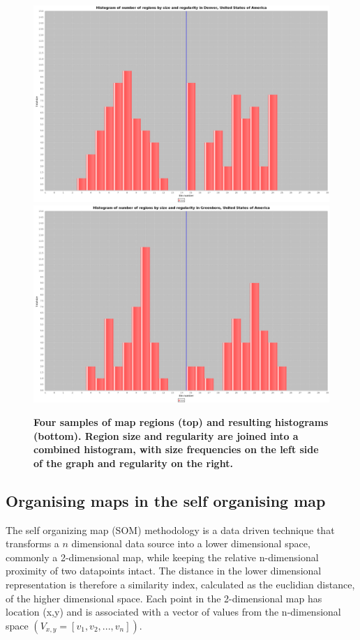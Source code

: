 \documentclass{nature}
\begin{document}
\begin{figure}
\includegraphics[scale=0.06]{Images/Combinedcity169-59949.png}
\includegraphics[scale=0.06]{Images/Combinedcity1521-754459.png}
\caption{\bf Four samples of map regions (top) and resulting histograms (bottom). Region size and regularity are joined into a combined histogram, with size frequencies on the left side of the graph and regularity on the right.}    
 \label{fig:mapsandHist}  
\end{figure} 


\subsection{Organising maps in the self organising map}\label{methodscluster}
The self organizing map (SOM) methodology \cite{Kohonen1982} is a data driven technique that transforms a $n$ dimensional data source into a lower dimensional space, commonly a 2-dimensional map, while keeping the relative n-dimensional proximity of two datapoints intact. The distance in the lower dimensional representation is therefore a similarity index, calculated as the euclidian distance, of the higher dimensional space. Each point in the 2-dimensional map has location (x,y) and is associated with a vector of values from the n-dimensional space $(V_{x,y} = [v_{1},v_{2},...,v_{n}])$.
\end{document}
